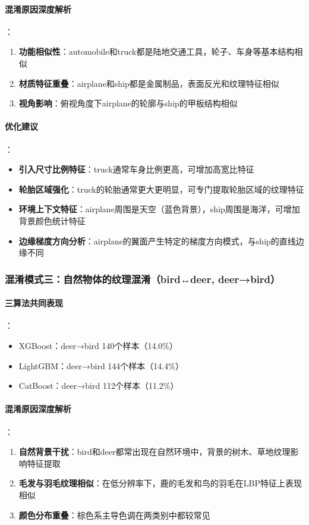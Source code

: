 \documentclass[UTF8]{report}
\theoremstyle{MyLineTheoremStyle} %
\theoremstyle{MyBlockTheoremStyle} %
\theoremstyle{MySubsubsectionStyle} %
\begin{document}
\paragraph{混淆原因深度解析}：
\begin{enumerate}
    \item \textbf{功能相似性}：automobile和truck都是陆地交通工具，轮子、车身等基本结构相似
    \item \textbf{材质特征重叠}：airplane和ship都是金属制品，表面反光和纹理特征相似
    \item \textbf{视角影响}：俯视角度下airplane的轮廓与ship的甲板结构相似
\end{enumerate}
\paragraph{优化建议}：
\begin{itemize}
    \item \textbf{引入尺寸比例特征}：truck通常车身比例更高，可增加高宽比特征
    \item \textbf{轮胎区域强化}：truck的轮胎通常更大更明显，可专门提取轮胎区域的纹理特征
    \item \textbf{环境上下文特征}：airplane周围是天空（蓝色背景），ship周围是海洋，可增加背景颜色统计特征
    \item \textbf{边缘梯度方向分析}：airplane的翼面产生特定的梯度方向模式，与ship的直线边缘不同
\end{itemize}

\subsubsection{混淆模式三：自然物体的纹理混淆（bird↔deer, deer→bird）}
\paragraph{三算法共同表现}：
\begin{itemize}
    \item XGBoost：deer→bird 140个样本（14.0\%）
    \item LightGBM：deer→bird 144个样本（14.4\%）
    \item CatBoost：deer→bird 112个样本（11.2\%）
\end{itemize}
\paragraph{混淆原因深度解析}：
\begin{enumerate}
    \item \textbf{自然背景干扰}：bird和deer都常出现在自然环境中，背景的树木、草地纹理影响特征提取
    \item \textbf{毛发与羽毛纹理相似}：在低分辨率下，鹿的毛发和鸟的羽毛在LBP特征上表现相似
    \item \textbf{颜色分布重叠}：棕色系主导色调在两类别中都较常见
\end{enumerate}
\end{document}

